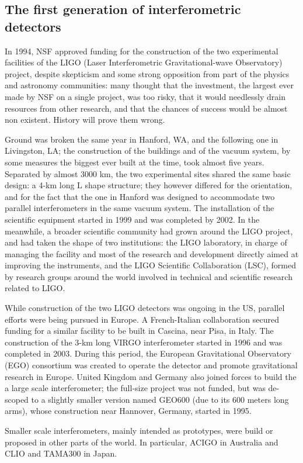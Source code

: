 \newpage
\subsection{The first generation of interferometric detectors}\label{subsec:history}

In 1994, NSF approved funding for the construction of the two experimental facilities of the LIGO (Laser Interferometric Gravitational-wave Observatory) project, despite skepticism and some strong opposition from part of the physics and astronomy communities: many thought that the investment, the largest ever made by NSF on a single project, was too risky, that it would needlessly drain resources from other research, and that the chances of success would be almost non existent. History will prove them wrong.

Ground was broken the same year in Hanford, WA, and the following one in Livingston, LA; the construction of the buildings and of the vacuum system, by some measures the biggest ever built at the time, took almost five years. Separated by almost 3000 km, the two experimental sites shared the same basic design: a 4-km long L shape structure; they however differed for the orientation, and for the fact that the one in Hanford was designed to accommodate two parallel interferometers in the same vacuum system. The installation of the scientific equipment started in 1999 and was completed by 2002. In the meanwhile, a broader scientific community had grown around the LIGO project, and had taken the shape of two institutions: the LIGO laboratory, in charge of managing the facility and most of the research and development directly aimed at improving the instruments, and the LIGO Scientific Collaboration (LSC), formed by research groups around the world involved in technical and scientific research related to LIGO.

While construction of the two LIGO detectors was ongoing in the US, parallel efforts were being pursued in Europe. A French-Italian collaboration secured funding for a similar facility to be built in Cascina, near Pisa, in Italy. The construction of the 3-km long VIRGO interferometer started in 1996 and was completed in 2003. During this period, the European Gravitational Observatory (EGO) consortium was created to operate the detector and promote gravitational research in Europe. United Kingdom and Germany also joined forces to build the a large scale interferometer; the full-size project was not funded, but was de-scoped to a slightly smaller version named GEO600 (due to its 600 meters long arms), whose construction near Hannover, Germany, started in 1995.

Smaller scale interferometers, mainly intended as prototypes, were build or proposed in other parts of the world. In particular, ACIGO in Australia and CLIO and TAMA300 in Japan.

